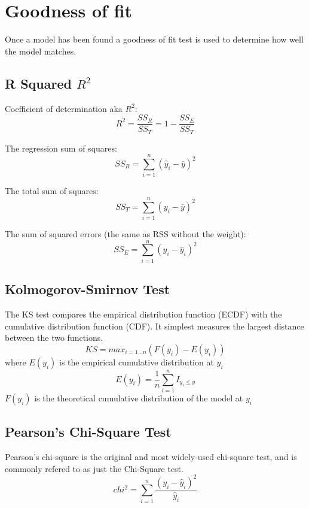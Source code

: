 \documentclass[a4paper]{sig-alternate}
\begin{document}
\section{Goodness of fit}
    Once a model has been found a goodness of fit test is used to determine how well the model matches.

\subsection{R Squared $R^{2}$}

Coefficient of determination aka $R^{2}$:
\begin{displaymath}
    R^{2} = \frac{SS_{R}}{SS_{T}} = 1 - \frac{SS_{E}}{SS_{T}}
\end{displaymath}

The regression sum of squares:
\begin{displaymath}
    SS_{R} = \sum_{i=1}^n (\hat{y}_{i} - \bar{y})^{2}
\end{displaymath}

The total sum of squares:
\begin{displaymath}
    SS_{T} = \sum_{i=1}^n (y_{i} - \bar{y})^{2}
\end{displaymath}

The sum of squared errors (the same as RSS without the weight):
\begin{displaymath}
    SS_{E} = \sum_{i=1}^n (y_{i} - \hat{y}_{i})^{2}
\end{displaymath}

\subsection{Kolmogorov-Smirnov Test}
The KS test compares the empirical distribution function (ECDF) with the cumulative distribution function (CDF). It simplest measures the largest distance between the two functions.
\begin{displaymath}
    KS = max_{i=1...n} ( F(y_{i}) - E(y_{i}) )
\end{displaymath}
where $E(y_{i})$ is the empirical cumulative distribution at $y_{i}$
\begin{displaymath}
    E(y_{i}) = \frac{1}{n} \sum_{i=1}^n I_{y_{i} \leq y}
\end{displaymath}
$F(y_{i})$ is the theoretical cumulative distribution of the model at $y_{i}$\\

\subsection{Pearson's Chi-Square Test }
Pearson's chi-square is the original and most widely-used chi-square test, and is commonly refered to as just the Chi-Square test.
\begin{displaymath}
    chi^2 = \sum_{i=1}^n \frac{ ( y_{i} - \hat{y}_{i} )^2 } {\hat{y}_{i}}
\end{displaymath}
\end{document}
